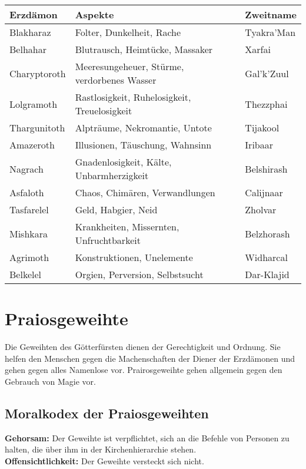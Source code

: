 \documentclass[../../Heldenanleitung2]{subfiles}
\begin{document}
{
\begin{table}[h!]
\centering
\begin{tabular}{|l|l|l|}
\hline
\textbf{Erzdämon} & \textbf{Aspekte} & \textbf{Zweitname}\\
\hline
Blakharaz & Folter, Dunkelheit, Rache & Tyakra'Man\\
Belhahar & Blutrausch, Heimtücke, Massaker & Xarfai\\
Charyptoroth & Meeresungeheuer, Stürme, verdorbenes Wasser & Gal'k'Zuul\\
Lolgramoth & Rastlosigkeit, Ruhelosigkeit, Treuelosigkeit & Thezzphai\\
Thargunitoth & Alpträume, Nekromantie, Untote & Tijakool\\
Amazeroth & Illusionen, Täuschung, Wahnsinn & Iribaar\\
Nagrach & Gnadenlosigkeit, Kälte, Unbarmherzigkeit & Belshirash\\
Asfaloth & Chaos, Chimären, Verwandlungen & Calijnaar\\
Tasfarelel & Geld, Habgier, Neid & Zholvar\\
Mishkara & Krankheiten, Missernten, Unfruchtbarkeit & Belzhorash\\
Agrimoth & Konstruktionen, Unelemente & Widharcal\\
Belkelel & Orgien, Perversion, Selbstsucht & Dar-Klajid\\
\hline
\end{tabular}
\end{table}
}
\section{Praiosgeweihte}
Die Geweihten des Götterfürsten dienen der Gerechtigkeit und Ordnung.
Sie helfen den Menschen
gegen die Machenschaften
der Diener der Erzdämonen
und gehen gegen
alles Namenlose vor. Prairosgeweihte gehen allgemein gegen den Gebrauch von Magie vor. 

\subsection{Moralkodex der Praiosgeweihten}
\textbf{Gehorsam:} Der Geweihte ist verpflichtet, sich an die
Befehle von Personen zu halten, die über ihm in der
Kirchenhierarchie stehen.\\

\noindent
\textbf{Offensichtlichkeit:} Der Geweihte versteckt sich nicht.\\
\end{document}
